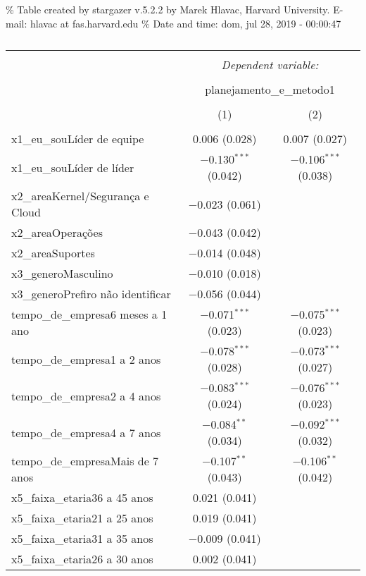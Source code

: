 \documentclass[]{book}
\begin{document}
\% Table created by stargazer v.5.2.2 by Marek Hlavac, Harvard University. E-mail: hlavac at fas.harvard.edu
\% Date and time: dom, jul 28, 2019 - 00:00:47

\begin{table}[!htbp] \centering 
  \caption{} 
  \label{} 
\begin{tabular}{@{\extracolsep{5pt}}lcc} 
\\[-1.8ex]\hline 
\hline \\[-1.8ex] 
 & \multicolumn{2}{c}{\textit{Dependent variable:}} \\ 
\cline{2-3} 
\\[-1.8ex] & \multicolumn{2}{c}{planejamento\_e\_metodo1} \\ 
\\[-1.8ex] & (1) & (2)\\ 
\hline \\[-1.8ex] 
 x1\_eu\_souLíder de equipe & 0.006 (0.028) & 0.007 (0.027) \\ 
  x1\_eu\_souLíder de líder & $-$0.130$^{***}$ (0.042) & $-$0.106$^{***}$ (0.038) \\ 
  x2\_areaKernel/Segurança e Cloud & $-$0.023 (0.061) &  \\ 
  x2\_areaOperações & $-$0.043 (0.042) &  \\ 
  x2\_areaSuportes & $-$0.014 (0.048) &  \\ 
  x3\_generoMasculino & $-$0.010 (0.018) &  \\ 
  x3\_generoPrefiro não identificar & $-$0.056 (0.044) &  \\ 
  tempo\_de\_empresa6 meses a 1 ano & $-$0.071$^{***}$ (0.023) & $-$0.075$^{***}$ (0.023) \\ 
  tempo\_de\_empresa1 a 2 anos & $-$0.078$^{***}$ (0.028) & $-$0.073$^{***}$ (0.027) \\ 
  tempo\_de\_empresa2 a 4 anos & $-$0.083$^{***}$ (0.024) & $-$0.076$^{***}$ (0.023) \\ 
  tempo\_de\_empresa4 a 7 anos & $-$0.084$^{**}$ (0.034) & $-$0.092$^{***}$ (0.032) \\ 
  tempo\_de\_empresaMais de 7 anos & $-$0.107$^{**}$ (0.043) & $-$0.106$^{**}$ (0.042) \\ 
  x5\_faixa\_etaria36 a 45 anos & 0.021 (0.041) &  \\ 
  x5\_faixa\_etaria21 a 25 anos & 0.019 (0.041) &  \\ 
  x5\_faixa\_etaria31 a 35 anos & $-$0.009 (0.041) &  \\ 
  x5\_faixa\_etaria26 a 30 anos & 0.002 (0.041) &  \\ 

\end{tabular}
\end{table}
\end{document}
